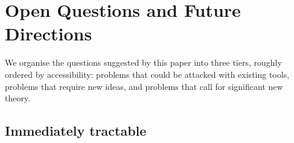
\section{Open Questions and Future Directions}
\label{sec:open}

We organise the questions suggested by this paper into three tiers,
roughly ordered by accessibility: problems that could be attacked with
existing tools, problems that require new ideas, and problems that
call for significant new theory.


\subsection{Immediately tractable}

